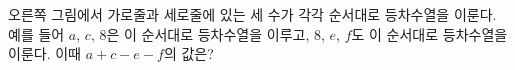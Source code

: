 \noindent\begin{minipage}[t]{0.58\linewidth}\vspace{0pt}\raggedright 오른쪽 그림에서 가로줄과 세로줄에 있는 세 수가 각각 순서대로 등차수열을 이룬다. 예를 들어 $a$, $c$, $8$은 이 순서대로 등차수열을 이루고, $8$, $e$, $f$도 이 순서대로 등차수열을 이룬다. 이때 $a+c-e-f$의 값은?\end{minipage}\hfill\begin{minipage}[t]{0.4\linewidth}\vspace{0pt}\centering \resizebox{\ifdim\width>\linewidth\linewidth\else\width\fi}{!}{}\end{minipage}\par
{}
